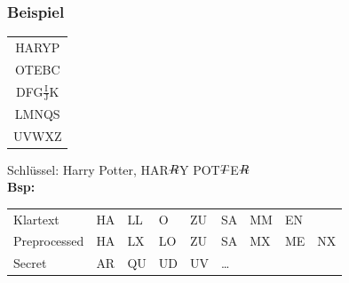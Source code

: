 \documentclass[10pt]{article}
\newcommand{\Bold}[1]{\textbf{#1}} %
\newcommand{\T}[1]{\text{#1}} %
\newcommand{\Nicht}[1]{\T{\sout{$ #1 $}}} %
\begin{document}
\subsubsection{Beispiel}
\begin{tabular}{|c|}\hline
 HARYP\\
 OTEBC\\
 DFG$\frac{\T{I}}{\T{J}}$K\\
 LMNQS\\
 UVWXZ\\\hline
\end{tabular}
Schlüssel: Harry Potter, HAR$\Nicht{R}$Y POT$\Nicht{T}$E$\Nicht{R}$\\
\Bold{Bsp:}
\begin{tabular}{lllllllll}
 Klartext&HA&LL&O&ZU&SA&MM&EN\\
 Preprocessed&HA&LX&LO&ZU&SA&MX&ME&NX\\
 Secret&AR&QU&UD&UV&\dots\\
\end{tabular}\\
\end{document}
